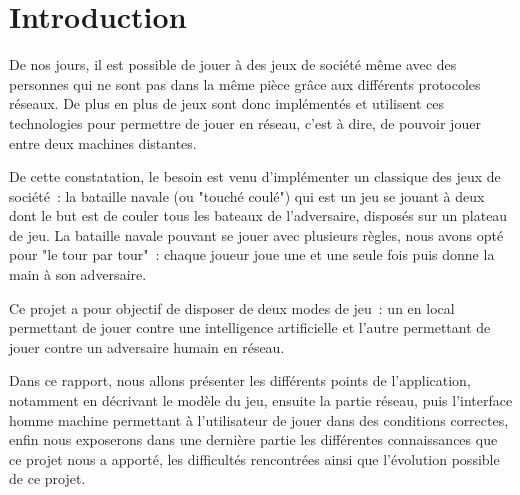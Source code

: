 \section*{Introduction} %
	De nos jours, il est possible de jouer à des jeux de société même avec des personnes qui ne sont pas dans la même pièce grâce aux différents protocoles réseaux. De plus en plus de jeux sont donc implémentés et utilisent ces technologies pour permettre de jouer en réseau, c'est à dire, de pouvoir jouer entre deux machines distantes. \newline

	De cette constatation, le besoin est venu d'implémenter un classique des jeux de société~: la bataille navale (ou "touché coulé") qui est un jeu se jouant à deux dont le but est de couler tous les bateaux de l'adversaire, disposés sur un plateau de jeu. La bataille navale pouvant se jouer avec plusieurs règles, nous avons opté pour "le tour par tour"~: chaque joueur joue une et une seule fois puis donne la main à son adversaire. \newline
	
	Ce projet a pour objectif de disposer de deux modes de jeu~: un en local permettant de jouer contre une intelligence artificielle et l'autre permettant de jouer contre un adversaire humain en réseau.\newline
	
	Dans ce rapport, nous allons présenter les différents points de l'application, notamment en décrivant le modèle du jeu, ensuite la partie réseau, puis l'interface homme machine permettant à l'utilisateur de jouer dans des conditions correctes, enfin nous exposerons dans une dernière partie les différentes connaissances que ce projet nous a apporté, les difficultés rencontrées ainsi que l'évolution possible de ce projet.
